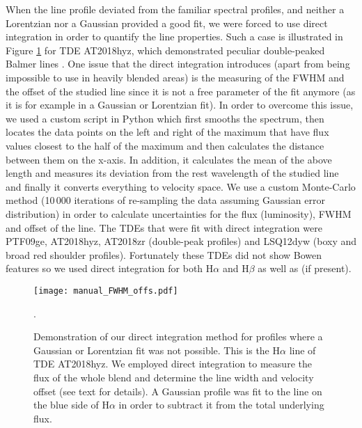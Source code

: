 \documentclass[structabstract]{aa}
\begin{document}
When the line profile deviated from the familiar spectral profiles, and neither a Lorentzian nor a Gaussian provided a good fit, we were forced to use direct integration in order to quantify the line properties. 
Such a case is illustrated in 
Figure \ref{fig:DG_fits} for TDE AT2018hyz, which demonstrated peculiar double-peaked Balmer lines \citep{Short2020a,Hung2020}.
One issue that the direct integration introduces (apart from being impossible to use in heavily blended areas) is the measuring of the FWHM and the offset of the studied line since it is not a free parameter of the fit anymore (as it is for example in a Gaussian or Lorentzian fit). In order to overcome this issue, we used a custom script in Python which first smooths the spectrum, then locates the data points on the left and right of the maximum that have flux values closest to the half of the maximum and then calculates the distance between them on the x-axis. In addition, it calculates the mean of the above length and measures its deviation from the rest wavelength of the studied line and finally it converts everything to velocity space. We use a custom Monte-Carlo method (10\,000 iterations of re-sampling the data assuming Gaussian error distribution) in order to calculate uncertainties for the flux (luminosity), FWHM and offset of the line. 
The TDEs that were fit with direct integration were PTF09ge, AT2018hyz, AT2018zr (double-peak profiles) and LSQ12dyw (boxy and broad red shoulder profiles). Fortunately these TDEs did not show Bowen features so we used direct integration for both H$\alpha$ and H$\beta$ as well as  (if present). 
\begin{figure}
\centering
\texttt{[image: manual\_FWHM\_offs.pdf]}
\caption{Demonstration of our direct integration method for profiles where a Gaussian or Lorentzian fit was not possible. This is the H$\alpha$ line of TDE AT2018hyz. We employed direct integration to measure the flux of the whole blend and determine the line width and velocity offset (see text for details). A Gaussian profile was fit to the line on the blue side of H$\alpha$ in order to subtract it from the total underlying flux. }.
\label{fig:DG_fits}
\end{figure}
\end{document}
